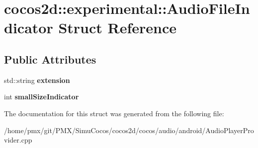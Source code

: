 \hypertarget{structcocos2d_1_1experimental_1_1AudioFileIndicator}{}\section{cocos2d\+:\+:experimental\+:\+:Audio\+File\+Indicator Struct Reference}
\label{structcocos2d_1_1experimental_1_1AudioFileIndicator}
\subsection*{Public Attributes}
\begin{DoxyCompactItemize}
\item 
\mbox{\label{structcocos2d_1_1experimental_1_1AudioFileIndicator_a01ba9e51680d913009589f70b7717e9e}} 
std\+::string {\bfseries extension}
\item 
\mbox{\label{structcocos2d_1_1experimental_1_1AudioFileIndicator_a9d9d61a7c5468047a40219a285bf1ca5}} 
int {\bfseries small\+Size\+Indicator}
\end{DoxyCompactItemize}


The documentation for this struct was generated from the following file\+:\begin{DoxyCompactItemize}
\item 
/home/pmx/git/\+P\+M\+X/\+Simu\+Cocos/cocos2d/cocos/audio/android/Audio\+Player\+Provider.\+cpp\end{DoxyCompactItemize}
